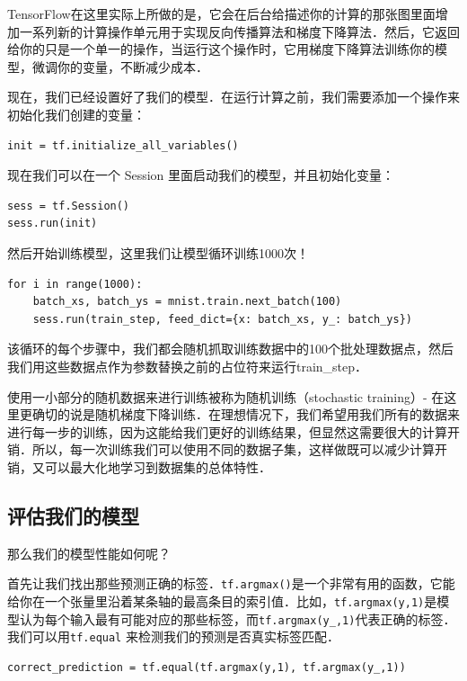 TensorFlow在这里实际上所做的是，它会在后台给描述你的计算的那张图里面增加一系列新的计算操作单元用于实现反向传播算法和梯度下降算法．然后，它返回给你的只是一个单一的操作，当运行这个操作时，它用梯度下降算法训练你的模型，微调你的变量，不断减少成本．

现在，我们已经设置好了我们的模型．在运行计算之前，我们需要添加一个操作来初始化我们创建的变量：

\begin{lstlisting}
init = tf.initialize_all_variables()
\end{lstlisting}

现在我们可以在一个 Session 里面启动我们的模型，并且初始化变量：
\begin{lstlisting}
sess = tf.Session()
sess.run(init)
\end{lstlisting}

然后开始训练模型，这里我们让模型循环训练1000次！
\begin{lstlisting}
for i in range(1000):
    batch_xs, batch_ys = mnist.train.next_batch(100)
    sess.run(train_step, feed_dict={x: batch_xs, y_: batch_ys})
\end{lstlisting}

该循环的每个步骤中，我们都会随机抓取训练数据中的100个批处理数据点，然后我们用这些数据点作为参数替换之前的占位符来运行train\_step．

使用一小部分的随机数据来进行训练被称为随机训练（stochastic training）- 在这里更确切的说是随机梯度下降训练．在理想情况下，我们希望用我们所有的数据来进行每一步的训练，因为这能给我们更好的训练结果，但显然这需要很大的计算开销．所以，每一次训练我们可以使用不同的数据子集，这样做既可以减少计算开销，又可以最大化地学习到数据集的总体特性．

\subsection{评估我们的模型}

那么我们的模型性能如何呢？

首先让我们找出那些预测正确的标签．\lstinline{tf.argmax()}是一个非常有用的函数，它能给你在一个张量里沿着某条轴的最高条目的索引值．比如，\lstinline{tf.argmax(y,1)}是模型认为每个输入最有可能对应的那些标签，而\lstinline{tf.argmax(y_,1)}代表正确的标签．我们可以用\lstinline{tf.equal} 来检测我们的预测是否真实标签匹配．

\begin{lstlisting}
correct_prediction = tf.equal(tf.argmax(y,1), tf.argmax(y_,1))
\end{lstlisting}

